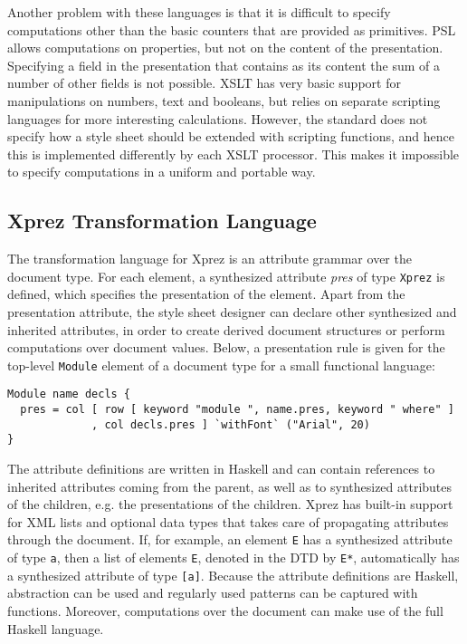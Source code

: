 Another problem with these languages is that it is difficult to specify computations other than the basic counters that are provided as primitives. PSL allows computations on properties, but not on the content of the presentation. Specifying a field in the presentation that contains as its content the sum of a number of other fields is not possible. XSLT has very basic support for manipulations on numbers, text and booleans, but relies on separate scripting languages for more interesting calculations. However, the standard does not specify how a style sheet should be extended with scripting functions, and hence this is implemented differently by each XSLT processor. This makes it impossible to specify computations in a uniform and portable way.


%																
\subsection{{\sc Xprez} Transformation Language}

The transformation language for {\sc Xprez} is an attribute grammar over the document type. For each element, a synthesized attribute {\em pres} of type \texttt{Xprez} is defined, which specifies the presentation of the element. Apart from the presentation attribute, the style sheet designer can declare other synthesized and inherited attributes, in order to create derived document structures or perform computations over document values. Below, a presentation rule is given for the top-level \texttt{Module} element of a document type for a small functional language:

\begin{small}
\begin{verbatim}
Module name decls {
  pres = col [ row [ keyword "module ", name.pres, keyword " where" ]   
             , col decls.pres ] `withFont` ("Arial", 20)
}
\end{verbatim}
\end{small}

The attribute definitions are written in Haskell and can contain references to inherited attributes coming from the parent, as well as to synthesized attributes of the children, e.g. the presentations of the children. {\sc Xprez} has built-in support for XML lists and optional data types that takes care of propagating attributes through the document. If, for example, an element \texttt{E} has a synthesized attribute of type \texttt{a}, then a list of elements \texttt{E}, denoted in the DTD by \texttt{E*}, automatically has a synthesized attribute of type \texttt{[a]}. Because the attribute definitions are Haskell, abstraction can be used and regularly used patterns can be captured with functions. Moreover, computations over the document can make use of the full Haskell language.


